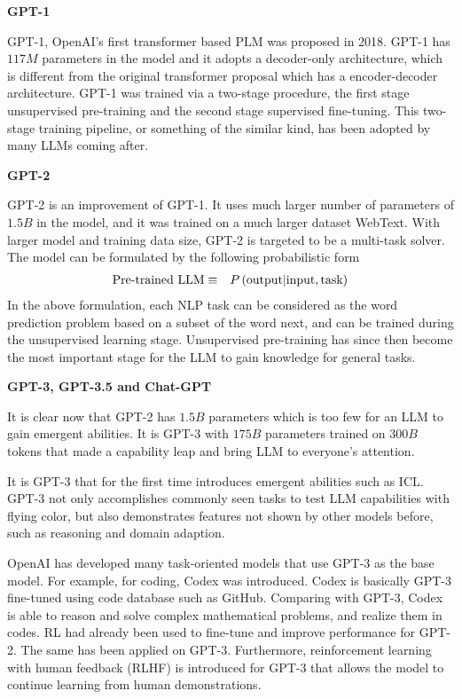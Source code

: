 \vspace{0.1in}
\noindent \textbf{GPT-1}
\vspace{0.1in}

GPT-1, OpenAI's first transformer based PLM was proposed in 2018. GPT-1 has $117M$ parameters in the model and it adopts a decoder-only architecture, which is different from the original transformer proposal which has a encoder-decoder architecture. GPT-1 was trained via a two-stage procedure, the first stage unsupervised pre-training and the second stage supervised fine-tuning. This two-stage training pipeline, or something of the similar kind, has been adopted by many LLMs coming after.

\vspace{0.1in}
\noindent \textbf{GPT-2}
\vspace{0.1in}

GPT-2 is an improvement of GPT-1. It uses much larger number of parameters of $1.5B$ in the model, and it was trained on a much larger dataset WebText. With larger model and training data size, GPT-2 is targeted to be a multi-task solver. The model can be formulated by the following probabilistic form
\begin{eqnarray}
  \textup{Pre-trained LLM} &\equiv& P\left(\textup{output}\middle|\textup{input}, \textup{task}\right) \nonumber
\end{eqnarray}
In the above formulation, each NLP task can be considered as the word prediction problem based on a subset of the word next, and can be trained during the unsupervised learning stage. Unsupervised pre-training has since then become the most important stage for the LLM to gain knowledge for general tasks.

\vspace{0.1in}
\noindent \textbf{GPT-3, GPT-3.5 and Chat-GPT}
\vspace{0.1in}

It is clear now that GPT-2 has $1.5B$ parameters which is too few for an LLM to gain emergent abilities. It is GPT-3 with $175B$ parameters trained on $300B$ tokens that made a capability leap and bring LLM to everyone's attention.

It is GPT-3 that for the first time introduces emergent abilities such as ICL. GPT-3 not only accomplishes commonly seen tasks to test LLM capabilities with flying color, but also demonstrates features not shown by other models before, such as reasoning and domain adaption.

OpenAI has developed many task-oriented models that use GPT-3 as the base model. For example, for coding, Codex was introduced. Codex is basically GPT-3 fine-tuned using code database such as GitHub. Comparing with GPT-3, Codex is able to reason and solve complex mathematical problems, and realize them in codes. RL had already been used to fine-tune and improve performance for GPT-2. The same has been applied on GPT-3. Furthermore, reinforcement learning with human feedback (RLHF) is introduced for GPT-3 that allows the model to continue learning from human demonstrations.

